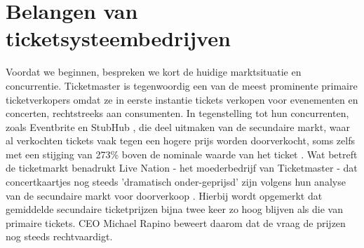 \section{Belangen van ticketsysteembedrijven}



Voordat we beginnen, bespreken we kort de huidige marktsituatie en concurrentie. Ticketmaster is tegenwoordig een van de meest prominente primaire 
ticketverkopers omdat ze in eerste instantie tickets verkopen voor evenementen en concerten, rechtstreeks aan consumenten. In tegenstelling tot 
hun concurrenten, zoals Eventbrite en StubHub \cite{Competitors:online}, die deel uitmaken van de secundaire markt, waar al verkochten tickets vaak tegen een hogere 
prijs worden doorverkocht, soms zelfs met een stijging van 273\% boven de nominale waarde van het ticket \cite{tompkinsanalysis}.
Wat betreft de ticketmarkt benadrukt Live Nation - het moederbedrijf van Ticketmaster - dat concertkaartjes nog steeds 'dramatisch onder-geprijsd'
 zijn volgens hun analyse van de secundaire markt voor doorverkoop \cite{Daniel:online}. Hierbij wordt opgemerkt dat gemiddelde secundaire ticketprijzen bijna twee 
 keer zo hoog blijven als die van primaire tickets. CEO Michael Rapino beweert daarom dat de vraag de prijzen nog steeds rechtvaardigt.

